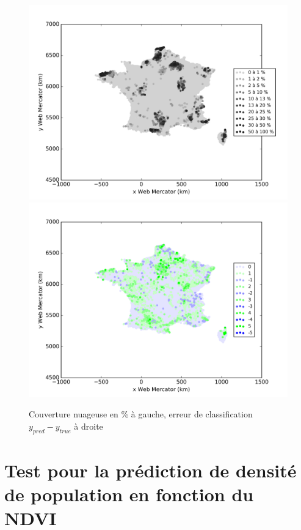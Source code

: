 \documentclass{book}
\begin{document}
\begin{figure}[H]
\centerline{
\includegraphics[scale=0.5]{../../data/France/test/Neural_Network_Classification-oversampling/Neural_Network_Classification-oversampling/density_covering.png}
\includegraphics[scale=0.5]{../../data/France/test/Neural_Network_Classification-oversampling/Neural_Network_Classification-oversampling/density_classification_error.png}
}
\caption{Couverture nuageuse en \% à gauche, erreur de classification $y_{pred}-y_{true}$  à droite}
\label{nuage}
\end{figure}


\chapter{Test pour la prédiction de densité de population en fonction du NDVI}
\end{document}

